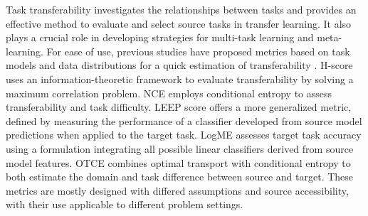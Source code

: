 Task transferability \citep{zamir2018taskonomy} investigates the relationships between tasks and provides an effective method to evaluate and select source tasks in transfer learning. It also plays a crucial role in developing strategies for multi-task learning and meta-learning. For ease of use, previous studies have proposed metrics based on task models and data distributions for a quick estimation of transferability \citep{ding2024model}.
H-score \citep{bao2019information, ibrahim2022newer, wu2024h} uses an information-theoretic framework to evaluate transferability by solving a maximum correlation problem. NCE \citep{tran2019transferability} employs conditional entropy to assess transferability and task difficulty. LEEP score \citep{nguyen2020leep, agostinelli2022transferability} offers a more generalized metric, defined by measuring the performance of a classifier developed from source model predictions when applied to the target task. LogME \citep{you2021logme} assesses target task accuracy using a formulation integrating all possible linear classifiers derived from source model features. 
OTCE \citep{tan2021otce, tan2024transferability} combines optimal transport with conditional entropy to both estimate the domain and task difference between source and target.
These metrics are mostly designed with differed assumptions and source accessibility, with their use applicable to different problem settings.